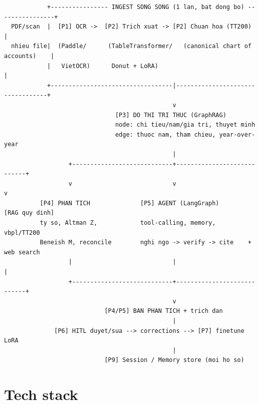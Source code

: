 \documentclass[11pt,a4paper]{article}
\begin{document}
\begin{verbatim}
            +---------------- INGEST SONG SONG (1 lan, bat dong bo) ----------------+
  PDF/scan  |  [P1] OCR ->  [P2] Trich xuat -> [P2] Chuan hoa (TT200)              |
  nhieu file|  (Paddle/      (TableTransformer/   (canonical chart of accounts)    |
            |   VietOCR)      Donut + LoRA)                                        |
            +----------------------------------|----------------------------------+
                                               v
                               [P3] DO THI TRI THUC (GraphRAG)
                               node: chi tieu/nam/gia tri, thuyet minh
                               edge: thuoc nam, tham chieu, year-over-year
                                               |
                  +----------------------------+----------------------------+
                  v                            v                            v
          [P4] PHAN TICH              [P5] AGENT (LangGraph)        [RAG quy dinh]
          ty so, Altman Z,            tool-calling, memory,         vbpl/TT200
          Beneish M, reconcile        nghi ngo -> verify -> cite    + web search
                  |                            |                            |
                  +----------------------------+----------------------------+
                                               v
                            [P4/P5] BAN PHAN TICH + trich dan
                                               |
              [P6] HITL duyet/sua --> corrections --> [P7] finetune LoRA
                                               |
                            [P9] Session / Memory store (moi ho so)
\end{verbatim}

\section{Tech stack}
\end{document}
